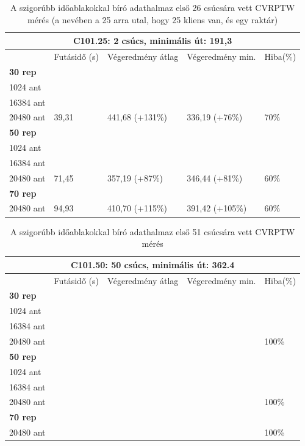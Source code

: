 \begin{table}[ht!]
	\centering
	\begin{tabular}{|p{1.75cm}||p{2cm}|p{3.25cm}|p{3.25cm}|p{1.5cm}|}
		\hline
		\multicolumn{5}{|c|}{C101.25: 2 csúcs, minimális út: 191,3} \\
		\hline
		& Futásidő (s) & Végeredmény átlag & Végeredmény min. & Hiba(\%) \\
		\hline
		\textbf{30 rep} &  &  &  &  \\
		1024 ant &  &  &  &  \\
		16384 ant & &  &  &  \\
		20480 ant & 39,31 & 441,68 (+131\%) & 336,19 (+76\%) & 70\% \\
		\hline
		\textbf{50 rep} &  &  &  &  \\
		1024 ant &  &  &  &  \\
		16384 ant &  &  &  &  \\
		20480 ant & 71,45 & 357,19 (+87\%) & 346,44 (+81\%) & 60\% \\
		\hline
		\textbf{70 rep} &  &  &  &  \\
		20480 ant & 94,93 & 410,70 (+115\%) & 391,42 (+105\%) & 60\% \\
		\hline
	\end{tabular}
	\caption{A szigorúbb időablakokkal bíró adathalmaz első 26 csúcsára vett CVRPTW mérés (a nevében a 25 arra utal, hogy 25 kliens van, és egy raktár)}
	\label{table:VRTPW_25_1}
\end{table}

\begin{table}[ht!]
	\centering
	\begin{tabular}{|p{1.75cm}||p{2cm}|p{3.25cm}|p{3.25cm}|p{1.5cm}|}
		\hline
		\multicolumn{5}{|c|}{C101.50: 50 csúcs, minimális út: 362.4} \\
		\hline
		& Futásidő (s) & Végeredmény átlag & Végeredmény min. & Hiba(\%) \\
		\hline
		\textbf{30 rep} &  &  &  &  \\
		1024 ant &  &  &  &  \\
		16384 ant & &  &  &  \\
		20480 ant &  &  &  & 100\%\\
		\hline
		\textbf{50 rep} &  &  &  &  \\
		1024 ant &  &  &  &  \\
		16384 ant &  &  &  &  \\
		20480 ant &  &  &  & 100\% \\
		\hline
		\textbf{70 rep} &  &  &  &  \\
		20480 ant &  &  &  & 100\% \\
		\hline
	\end{tabular}
	\caption{ A szigorúbb időablakokkal bíró adathalmaz első 51 csúcsára vett CVRPTW mérés}
	\label{table:VRTPW_50_1}
\end{table}

